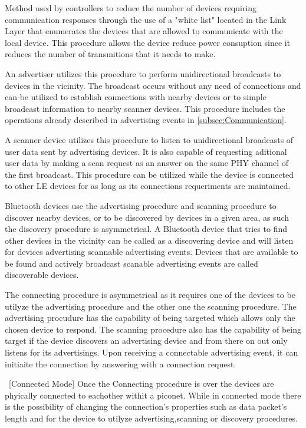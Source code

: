 \begin{description}
\item [Device Filtering Procedure] Method used by controllers to reduce the number of devices requiring communication responses through the use of a "white list" located in the Link Layer that enumerates the devices that are allowed to communicate with the local device. This procedure allows the device reduce power consuption since it reduces the number of transmitions that it needs to make.

\item [Advertising Procedure] An advertiser utilizes this procedure to perform unidirectional broadcasts to devices in the vicinity. The broadcast occurs without any need of connections and can be utilized to establish connections with nearby devices or to simple broadcast information to nearby scanner devices. This procedure includes the operations already described in advertising events in \ref{subsec:Communication}.

\item [Scanning Procedure] A scanner device utilizes this procedure to listen to unidirectional broadcasts of user data sent by advertising devices. It is also capable of requesting aditional user data by making a scan request as an answer on the same \ac{PHY} channel of the first broadcast. This procedure can be utilized while the device is connected to other \ac{LE} devices for as long as its connections requeriments are maintained.

\item [Discovering Procedure] Bluetooth devices use the advertising procedure and scanning procedure to discover nearby devices, or to be discovered by devices in a given area, as such the discovery procedure is asymmetrical. A Bluetooth device that tries to find other devices in the vicinity can be called as a discovering device and will listen for devices advertising scannable advertising events. Devices that are available to be found and actively broadcast scanable advertising events are called discoverable devices. 

\item [Connecting Procedure] The connecting procedure is asymmetrical as it requires one of the devices to be utilyze the advertising procedure and the other one the scanning procedure. The advertising procudure has the capability of being targeted which allows only the chosen device to respond.  The scanning procedure also has the capability of being target if the device discovers an advertising device and from there on out only listens for its advertisings. Upon receiving a connectable advertising event, it can initiaite the connection by answering with a connection request.

\item [Connected Mode] Once the Connecting procedure is over the devices are phyically connected to eachother withit a piconet. While in connected mode there is the possibility of changing the connection's properties such as data packet's length and for the device to utilyze advertising,scanning or discovery procedures.
\end{description}




